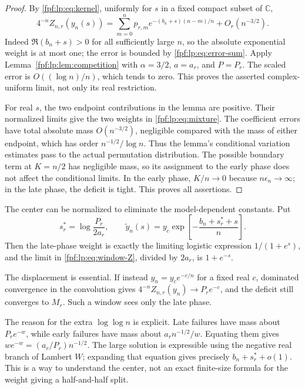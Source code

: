 \documentclass[11pt]{article}
\numberwithin{equation}{section}
\theoremstyle{definition}
\begin{document}
\begin{proof}
By \eqref{fpf:lp:eq:kernel}, uniformly for \(s\) in a fixed compact subset
of \(\mathbb C\),
\begin{equation}\label{fpf:lp:eq:window-convolution}
 4^{-n}Z_{n,r}(y_n(s))
 =\sum_{m=0}^np_{r,m}e^{-(b_n+s)(n-m)/n}+O_r(n^{-3/2}).
\end{equation}
Indeed \(\Re(b_n+s)>0\) for all sufficiently large \(n\), so the
absolute exponential weight is at most one; the error is bounded by
\eqref{fpf:lp:eq:error-sum}. Apply Lemma~\ref{fpf:lp:lem:competition} with
\(\alpha=3/2\), \(a=a_r\), and \(P=P_r\). The scaled error is
\(O((\log n)/n)\), which tends to zero. This proves the asserted
complex-uniform limit, not only its real restriction.

For real \(s\), the two endpoint contributions in the lemma are positive.
Their normalized limits give the two weights in \eqref{fpf:lp:eq:mixture}.
The coefficient errors have total absolute mass \(O(n^{-3/2})\),
negligible compared with the mass of either endpoint,
which has order \(n^{-1/2}/\log n\). Thus the lemma's conditional
variation estimates pass to the actual permutation distribution.
The possible boundary term at \(K=n/2\) has negligible mass, so its
assignment to the early phase does not affect the conditional limits.
In the early phase, \(K/n\to0\) because \(n\epsilon_n\to\infty\);
in the late phase, the deficit is tight. This proves all assertions.
\end{proof}

The center can be normalized to eliminate the model-dependent constants.
Put
\begin{equation}\label{fpf:lp:eq:centered-window}
 s_r^*=\log\frac{P_r}{2a_r},\qquad
 \widetilde y_n(s)=y_c\exp\!\left[-\frac{b_n+s_r^*+s}{n}\right].
\end{equation}
Then the late-phase weight is exactly the limiting logistic expression
\(1/(1+e^s)\), and the limit in \eqref{fpf:lp:eq:window-Z}, divided by
\(2a_r\), is \(1+e^{-s}\).

The displacement is essential. If instead \(y_n=y_c e^{-c/n}\)
for a fixed real \(c\), dominated convergence in the convolution gives
\(4^{-n}Z_{n,r}(y_n)\to P_re^{-c}\), and the deficit still converges
to \(M_r\). Such a window sees only the late phase.

The reason for the extra \(\log\log n\) is explicit. Late failures
have mass about \(P_re^{-w}\), while early failures have mass about
\(a_r n^{-1/2}/w\). Equating them gives
\(w e^{-w}=(a_r/P_r)n^{-1/2}\). The large solution is expressible
using the negative real branch of Lambert \(W\); expanding that equation
gives precisely \(b_n+s_r^*+o(1)\). This is a way to understand the
center, not an exact finite-size formula for the weight giving a
half-and-half split.
\end{document}
